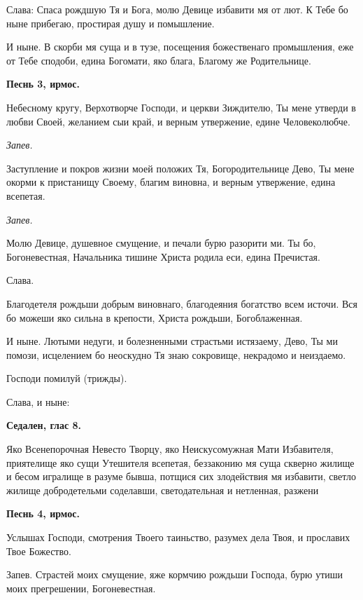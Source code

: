 Слава: Спаса рождшую Тя и Бога, молю Девице избавити мя от лют. К Тебе бо ныне прибегаю, простирая душу и помышление.

И ныне. В скорби мя суща и в тузе, посещения божественаго промышления, еже от Тебе сподоби, едина Богомати, яко блага, Благому же Родительнице.


\medskip


\bfseries Песнь 3, ирмос.\normalfont{}\nopagebreak


Небесному кругу, Верхотворче Господи, и церкви Зиждителю, Ты мене утверди в любви Своей, желанием сыи край, и верным утвержение,  едине Человеколюбче.


\itshape Запев.\normalfont{}


Заступление и покров жизни моей положих Тя, Богородительнице Дево, Ты мене окорми  к пристанищу Своему, благим виновна, и верным утвержение, едина всепетая.


\itshape Запев.\normalfont{}


Молю Девице, душевное смущение, и печали бурю разорити ми. Ты бо, Богоневестная, Начальника тишине Христа родила еси, едина Пречистая.


Слава.


Благодетеля рождьши добрым виновнаго, благодеяния богатство всем источи. Вся бо можеши яко сильна в крепости, Христа рождьши, Богоблаженная.

И ныне. Лютыми недуги, и болезненными страстьми истязаему, Дево, Ты ми помози, исцелением бо неоскудно Тя знаю сокровище, некрадомо и неиздаемо.

Господи помилуй (трижды). 

Слава, и ныне:


\medskip


\bfseries Седален, глас 8.\normalfont{}\nopagebreak


Яко Всенепорочная Невесто Творцу, яко Неискусомужная Мати Избавителя, приятелище яко сущи Утешителя всепетая, беззаконию мя суща скверно жилище и бесом игралище в разуме бывша, потщися сих злодействия мя избавити, светло жилище добродетельми соделавши, светодательная и нетленная, разжени


\medskip


\bfseries Песнь 4, ирмос.\normalfont{}\nopagebreak


Услышах Господи, смотрения Твоего таиньство, разумех дела Твоя, и прославих Твое Божество.

Запев. Страстей моих смущение, яже кормчию  рождьши Господа, бурю утиши моих прегрешении, Богоневестная.

